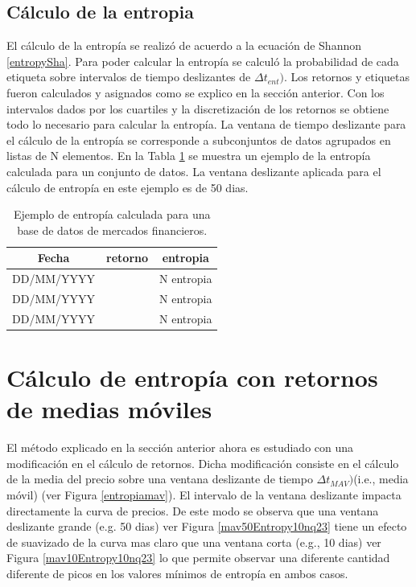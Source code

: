 \subsection{Cálculo de la entropia}
\label{sec_entropia}
El cálculo de la entropía se realizó de acuerdo a la ecuación de Shannon \ref{entropySha}.
Para poder calcular la entropía se calculó la probabilidad de cada etiqueta sobre intervalos de tiempo deslizantes de $\Delta t_{ent})$.
Los retornos y etiquetas fueron calculados y asignados como se explico en la sección anterior. 
Con los intervalos dados por los cuartiles y la discretización de los retornos se obtiene todo lo necesario para calcular la entropía.
La ventana de tiempo deslizante para el cálculo de la entropía se corresponde a subconjuntos de datos agrupados en listas de N elementos.
En la Tabla \ref{entropytable} se muestra un ejemplo de la entropía calculada para un conjunto de datos. 
La ventana deslizante aplicada para el cálculo de entropía en este ejemplo es de 50 dias.

\begin{table}
	\begin{center}
	\begin{tabular}{|c|c|c|}
		\hline 
		Fecha & retorno & entropia \\ 
		\hline 
		DD/MM/YYYY & $$$$ & N entropia\\ 
		DD/MM/YYYY & $$$$ & N entropia\\ 
		DD/MM/YYYY & $$$$ & N entropia\\ 
		\hline 
	\end{tabular} 
	\label{entropytable}
	\caption{Ejemplo de entropía calculada para una base de datos de mercados financieros.}
\end{center}
\end{table}




\section{Cálculo de entropía con retornos de medias móviles}
\label{metodo_MAV}
El método explicado en la sección anterior ahora es estudiado con una modificación en el cálculo de retornos.
Dicha modificación consiste en el cálculo de la media del precio sobre una ventana deslizante de tiempo $\Delta t_{MAV})$(i.e., media móvil) (ver Figura \ref{entropiamav}). 
El intervalo de la ventana deslizante impacta directamente la curva de precios.
De este modo se observa que una ventana deslizante grande (e.g. 50 dias) ver Figura \ref{mav50Entropy10nq23} tiene un efecto de suavizado de la curva mas claro que una ventana corta (e.g., 10 dias) ver Figura \ref{mav10Entropy10nq23} lo que permite observar una diferente cantidad diferente de picos en los valores mínimos de entropía en ambos casos. 



